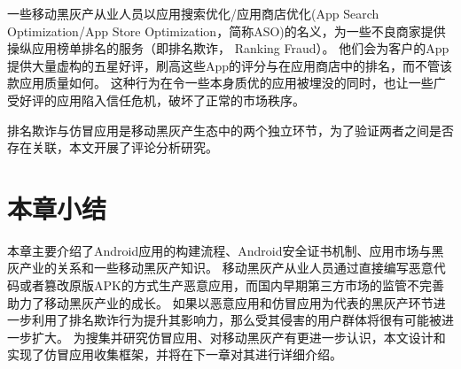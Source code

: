 一些移动黑灰产从业人员以应用搜索优化/应用商店优化(App Search Optimization/App Store Optimization，简称ASO)的名义，为一些不良商家提供操纵应用榜单排名的服务（即排名欺诈， Ranking Fraud）。
他们会为客户的App提供大量虚构的五星好评，刷高这些App的评分与在应用商店中的排名，而不管该款应用质量如何\cite{xie2014grouptie, xie2015appwatcher, xie2016you}。
这种行为在令一些本身质优的应用被埋没的同时，也让一些广受好评的应用陷入信任危机，破坏了正常的市场秩序。

排名欺诈与仿冒应用是移动黑灰产生态中的两个独立环节，为了验证两者之间是否存在关联，本文开展了评论分析研究。

\section{本章小结}
本章主要介绍了Android应用的构建流程、Android安全证书机制、应用市场与黑灰产业的关系和一些移动黑灰产知识。
移动黑灰产从业人员通过直接编写恶意代码或者篡改原版APK的方式生产恶意应用，而国内早期第三方市场的监管不完善助力了移动黑灰产业的成长。
如果以恶意应用和仿冒应用为代表的黑灰产环节进一步利用了排名欺诈行为提升其影响力，那么受其侵害的用户群体将很有可能被进一步扩大。
为搜集并研究仿冒应用、对移动黑灰产有更进一步认识，本文设计和实现了仿冒应用收集框架\mytool，并将在下一章对其进行详细介绍。
